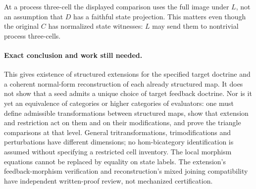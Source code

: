 \documentclass{article}
\begin{document}
At a process three-cell the displayed comparison uses the full image under $L$, not an assumption that $D$ has a faithful state projection. This matters even though the original $C$ has normalized state witnesses: $L$ may send them to nontrivial process three-cells.

\paragraph{Exact conclusion and work still needed.} This gives existence of structured extensions for the specified target doctrine and a coherent normal-form reconstruction of each already structured map. It does not show that a seed admits a unique choice of target feedback doctrine. Nor is it yet an equivalence of categories or higher categories of evaluators: one must define admissible transformations between structured maps, show that extension and restriction act on them and on their modifications, and prove the triangle comparisons at that level. General tritransformations, trimodifications and perturbations have different dimensions; no hom-bicategory identification is assumed without specifying a restricted cell inventory. The local morphism equations cannot be replaced by equality on state labels. The extension's feedback-morphism verification and reconstruction's mixed joining compatibility have independent written-proof review, not mechanized certification.
\end{document}
